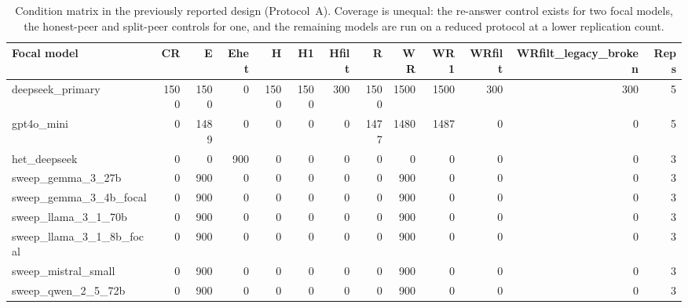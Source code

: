 \begin{table}[t]
\centering
\footnotesize
\caption{Condition matrix in the previously reported design (Protocol~A). Coverage is unequal: the re-answer control exists for two focal models, the honest-peer and split-peer controls for one, and the remaining models are run on a reduced protocol at a lower replication count.\label{tab:coverage_legacy}}
\begin{adjustbox}{max width=\linewidth}
\begin{tabular}{@{}lrrrrrrrrrrrr@{}}
\toprule
Focal model & CR & E & Ehet & H & H1 & Hfilt & R & WR & WR1 & WRfilt & WRfilt\_legacy\_broken & Reps \\
\midrule
deepseek\_primary & 1500 & 1500 & 0 & 1500 & 1500 & 300 & 1500 & 1500 & 1500 & 300 & 300 & 5 \\
gpt4o\_mini & 0 & 1489 & 0 & 0 & 0 & 0 & 1477 & 1480 & 1487 & 0 & 0 & 5 \\
het\_deepseek & 0 & 0 & 900 & 0 & 0 & 0 & 0 & 0 & 0 & 0 & 0 & 3 \\
sweep\_gemma\_3\_27b & 0 & 900 & 0 & 0 & 0 & 0 & 0 & 900 & 0 & 0 & 0 & 3 \\
sweep\_gemma\_3\_4b\_focal & 0 & 900 & 0 & 0 & 0 & 0 & 0 & 900 & 0 & 0 & 0 & 3 \\
sweep\_llama\_3\_1\_70b & 0 & 900 & 0 & 0 & 0 & 0 & 0 & 900 & 0 & 0 & 0 & 3 \\
sweep\_llama\_3\_1\_8b\_focal & 0 & 900 & 0 & 0 & 0 & 0 & 0 & 900 & 0 & 0 & 0 & 3 \\
sweep\_mistral\_small & 0 & 900 & 0 & 0 & 0 & 0 & 0 & 900 & 0 & 0 & 0 & 3 \\
sweep\_qwen\_2\_5\_72b & 0 & 900 & 0 & 0 & 0 & 0 & 0 & 900 & 0 & 0 & 0 & 3 \\
\bottomrule
\end{tabular}
\end{adjustbox}
\end{table}
